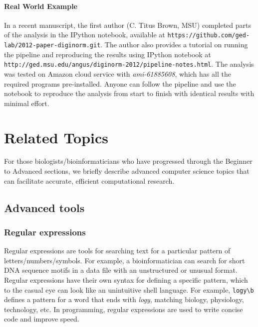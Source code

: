 \documentclass[ChapterTOCs,krantz2]{krantz} %
\begin{document}
\paragraph{Real World Example}

In a recent manuscript, the first author (C. Titus Brown, MSU) completed parts
of the analysis in the IPython notebook, available at
\texttt{https://github.com/ged-lab/2012-paper-diginorm.git}. The author also
provides a tutorial on running the pipeline and reproducing the
results using IPython notebook at
\texttt{http://ged.msu.edu/angus/diginorm-2012/pipeline-notes.html}. 
The analysis was tested on Amazon cloud service with
\emph{ami-61885608}, which has all the required programs pre-installed. Anyone
can follow the pipeline and use the notebook to reproduce the
analysis from start to finish with identical results with minimal effort.

\section{Related Topics}

For those biologists/bioinformaticians who have progressed through the Beginner
to Advanced sections, we briefly describe advanced computer science topics 
that can facilitate accurate, efficient computational research.

\subsection{Advanced tools}


\subsubsection{Regular expressions}

Regular expressions are tools for
searching text for a particular pattern of letters/numbers/symbols.  For
example, a bioinformatician can search for short DNA sequence motifs in 
a data file with an unstructured or unusual format.  Regular expressions have their own
syntax for defining a specific pattern, which to the casual eye can look like
an unintuitive shell language. For example, \texttt{logy\textbackslash{}b} defines a pattern for a word
that ends with \emph{logy}, matching biology, physiology, technology, etc.
In programming, regular expressions are
used to write concise code and improve speed. 
\end{document}
